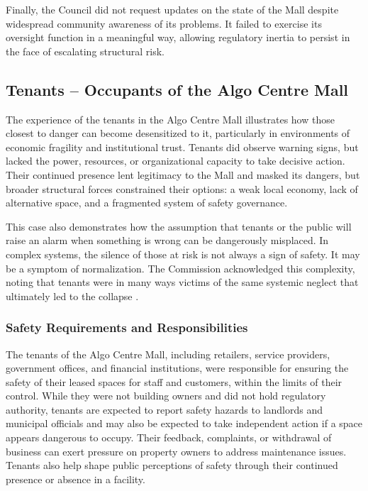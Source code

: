 \documentclass[12pt]{article}
\begin{document}
Finally, the Council did not request updates on the state of the Mall despite widespread community awareness of its problems. It failed to exercise its oversight function in a meaningful way, allowing regulatory inertia to persist in the face of escalating structural risk.

\subsection{Tenants – Occupants of the Algo Centre Mall}
The experience of the tenants in the Algo Centre Mall illustrates how those closest to danger can become desensitized to it, particularly in environments of economic fragility and institutional trust. Tenants did observe warning signs, but lacked the power, resources, or organizational capacity to take decisive action. Their continued presence lent legitimacy to the Mall and masked its dangers, but broader structural forces constrained their options: a weak local economy, lack of alternative space, and a fragmented system of safety governance.

This case also demonstrates how the assumption that tenants or the public will raise an alarm when something is wrong can be dangerously misplaced. In complex systems, the silence of those at risk is not always a sign of safety. It may be a symptom of normalization. The Commission acknowledged this complexity, noting that tenants were in many ways victims of the same systemic neglect that ultimately led to the collapse \cite[p250–251]{AlgoLakeReport1}.

\subsubsection*{Safety Requirements and Responsibilities}

The tenants of the Algo Centre Mall, including retailers, service providers, government offices, and financial institutions, were responsible for ensuring the safety of their leased spaces for staff and customers, within the limits of their control. While they were not building owners and did not hold regulatory authority, tenants are expected to report safety hazards to landlords and municipal officials and may also be expected to take independent action if a space appears dangerous to occupy. Their feedback, complaints, or withdrawal of business can exert pressure on property owners to address maintenance issues. Tenants also help shape public perceptions of safety through their continued presence or absence in a facility.
\end{document}
